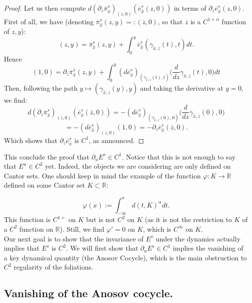 \documentclass[a4paper]{article}
\theoremstyle{definition}
\begin{document}
\begin{proof}
Let us then compute $d( \partial_z \overline{\pi}_{\widehat{x}}^s)_{(z,0)}(\overline{e}^s_{\widehat{x}}(z,0))$ in terms of $ \partial_z \overline{e}^s_{\widehat{x}}(z,0). $
First of all, we have (denoting  $\overline{\pi}_{\widehat{x}}^s(z,y) =: (\overline{z},0)$, so that $\overline{z}$ is a $C^{1+\alpha}$ function of $z,y$):
$$ (z,y) = \overline{\pi}_{\widehat{x}}^s(z,y) + \int_{0}^y \overline{e}^s_{\widehat{x}}(\gamma_{{\widehat{x}},\overline{z}}(t),t) dt .$$
Hence
$$ (1,0) = \partial_z \overline{\pi}_{\widehat{x}}^s(z,y) + \int_0^y (d \overline{e}_{\widehat{x}}^s)_{(\gamma_{{\widehat{x}},\overline{z}}(t),t)}\Big(  \frac{d}{dz} \gamma_{{\widehat{x}},\overline{z}}(t),0 \Big) dt $$
Then, following the path $y \mapsto (\gamma_{{\widehat{x}},\overline{z}}(y),y)$ and taking the derivative at $y=0$, we find:
$$ d(\partial_z \overline{\pi}_{\widehat{x}}^s)_{(\overline{z},0)}(\overline{e}^s_{\widehat{x}}(\overline{z},0)) = - (d \overline{e}_{\widehat{x}}^s)_{(\gamma_{{\widehat{x}},\overline{z}}(0),0)}\Big( \frac{d}{dz} \gamma_{{\widehat{x}},\overline{z}}(0),0 \Big) $$
$$ = - (d \overline{e}_{\widehat{x}}^s)_{(\overline{z},0)}( 1 ,0) = - \partial_z \overline{e}_{\widehat{x}}^s(\overline{z},0). $$
Which shows that $\partial_z \overline{e}_{\widehat{x}}^s$ is $C^{1}$, as announced.
\end{proof}

This conclude the proof that $\partial_u E^s \in C^1$. Notice that this is not enough to say that $E^u \in C^2$ yet.
Indeed, the objects we are considering are only defined on Cantor sets. One should keep in mind the example of the function $\varphi:K \rightarrow \mathbb{R}$ defined on some Cantor set $K \subset \mathbb{R}$:

$$ \varphi(x) := \int_{-\infty}^x d(t,K)^{\alpha} dt. $$
This function is $C^{1+}$ on $K$ but is not $C^2$ on $K$ (as it is not the restriction to $K$ of a $C^2$ function on $\mathbb{R}$). Still, we find $\varphi'=0$ on $K$, which is $C^\infty$ on $K$.\\

Our next goal is to show that the invariance of $E^s$ under the dynamics actually implies that $E^s$ is $C^2$. We will first show that $\partial_u E^s \in C^1$ implies the vanishing of a key dynamical quantity (the Anosov Cocycle), which is the main obstruction to $C^2$ regularity of the foliations.

\subsection{Vanishing of the Anosov cocycle.}
\end{document}
